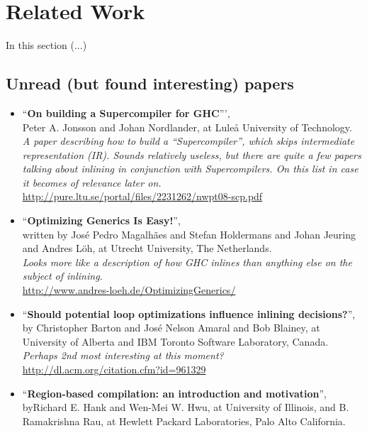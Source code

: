 
\section{Related Work}

In this section (...)

\subsection{Unread (but found interesting) papers}

\begin{itemize}
	\item ``\textbf{On building a Supercompiler for GHC}''', \\ Peter A. Jonsson
and Johan Nordlander, at Luleå University of Technology. \\
\textit{A paper describing how to build a ``Supercompiler'', which skips
intermediate representation (IR). Sounds relatively useless, but there are
quite a few papers talking about inlining in conjunction with Supercompilers.
On this list in case it becomes of relevance later on.}\\
\url{http://pure.ltu.se/portal/files/2231262/nwpt08-scp.pdf}
	\item ``\textbf{Optimizing Generics Is Easy!}'', \\ written by José Pedro
Magalhães and Stefan Holdermans and Johan Jeuring and Andres Löh, at Utrecht
University, The Netherlands. \\
\textit{Looks more like a description of how GHC inlines than anything else on
the subject of inlining.}\\
\url{http://www.andres-loeh.de/OptimizingGenerics/}
	\item ``\textbf{Should potential loop optimizations influence inlining
decisions?}'', by Christopher Barton and José Nelson Amaral and Bob Blainey, at
University of Alberta and IBM Toronto Software Laboratory, Canada. \\
\textit{Perhaps 2nd most interesting at this moment?}\\
\url{http://dl.acm.org/citation.cfm?id=961329}
	\item ``\textbf{Region-based compilation: an introduction and motivation}'',
\\ byRichard E. Hank and Wen-Mei W. Hwu, at University of Illinois, and B.
Ramakrishna Rau, at Hewlett Packard Laboratories, Palo Alto California. \\

\end{itemize}
